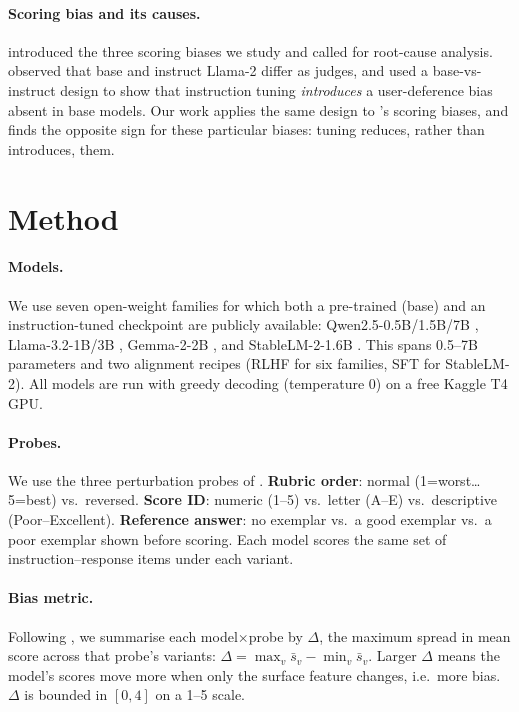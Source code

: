 \documentclass[11pt]{article}
\begin{document}
\paragraph{Scoring bias and its causes.} \citet{li2025scoring} introduced the
three scoring biases we study and called for root-cause analysis.
\citet{thakur2024judging} observed that base and instruct Llama-2 differ as
judges, and \citet{pan2025user} used a base-vs-instruct design to show that
instruction tuning \emph{introduces} a user-deference bias absent in base models.
Our work applies the same design to \citet{li2025scoring}'s scoring biases, and
finds the opposite sign for these particular biases: tuning reduces, rather than
introduces, them.

\section{Method}
\paragraph{Models.} We use seven open-weight families for which both a
pre-trained (base) and an instruction-tuned checkpoint are publicly available:
Qwen2.5-0.5B/1.5B/7B \citep{qwen25}, Llama-3.2-1B/3B \citep{llama3},
Gemma-2-2B \citep{gemma2}, and StableLM-2-1.6B \citep{stablelm2}. This spans
0.5--7B parameters and two alignment recipes (RLHF for six families, SFT for
StableLM-2). All models are run with greedy decoding (temperature 0) on a free
Kaggle T4 GPU.

\paragraph{Probes.} We use the three perturbation probes of
\citet{li2025scoring}. \textbf{Rubric order}: normal (1=worst\dots5=best) vs.\
reversed. \textbf{Score ID}: numeric (1--5) vs.\ letter (A--E) vs.\ descriptive
(Poor--Excellent). \textbf{Reference answer}: no exemplar vs.\ a good exemplar
vs.\ a poor exemplar shown before scoring. Each model scores the same set of
instruction--response items under each variant.

\paragraph{Bias metric.} Following \citet{li2025scoring}, we summarise each
model$\times$probe by $\Delta$, the maximum spread in mean score across that
probe's variants: $\Delta = \max_v \bar{s}_v - \min_v \bar{s}_v$. Larger $\Delta$
means the model's scores move more when only the surface feature changes, i.e.\
more bias. $\Delta$ is bounded in $[0,4]$ on a 1--5 scale.
\end{document}
